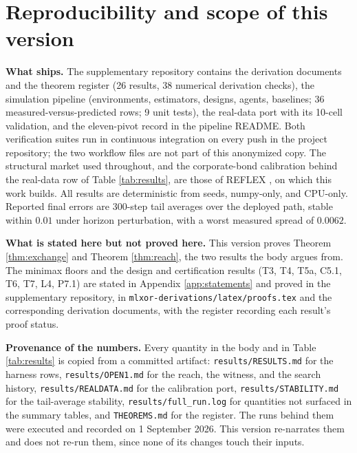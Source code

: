 \documentclass{article}
\begin{document}
\section{Reproducibility and scope of this version}
\label{app:repro}

\textbf{What ships.} The supplementary repository contains the derivation
documents and the theorem register (26 results, 38 numerical derivation
checks), the simulation pipeline (environments, estimators, designs, agents,
baselines; 36 measured-versus-predicted rows; 9 unit tests), the real-data
port with its 10-cell validation, and the eleven-pivot record in the pipeline
README. Both verification suites run in continuous integration on every push
in the project repository; the two workflow files are not part of this
anonymized copy. The structural market used throughout, and the corporate-bond
calibration behind the real-data row of Table \ref{tab:results}, are those of REFLEX
\citep{reflex2026}, on which this work builds. All results are deterministic from seeds, numpy-only, and CPU-only.
Reported final errors are 300-step tail averages over the deployed path,
stable within $0.01$ under horizon perturbation, with a worst measured spread
of $0.0062$.

\textbf{What is stated here but not proved here.} This version proves
Theorem \ref{thm:exchange} and Theorem \ref{thm:reach}, the two results the
body argues from. The minimax floors and the design and certification
results (T3, T4, T5a, C5.1, T6, T7, L4, P7.1) are stated in Appendix
\ref{app:statements} and proved in the supplementary repository, in
\texttt{mlxor-derivations/latex/proofs.tex} and the corresponding derivation
documents, with the register recording each result's proof status.

\textbf{Provenance of the numbers.} Every quantity in the body and in Table
\ref{tab:results} is copied from a committed artifact:
\texttt{results/RESULTS.md} for the harness rows, \texttt{results/OPEN1.md}
for the reach, the witness, and the search history,
\texttt{results/REALDATA.md} for the calibration port,
\texttt{results/STABILITY.md} for the tail-average stability,
\texttt{results/full\_run.log} for quantities not surfaced in the summary
tables, and \texttt{THEOREMS.md} for the register. The runs behind them were
executed and recorded on 1 September 2026. This version re-narrates them and
does not re-run them, since none of its changes touch their inputs.
\end{document}
